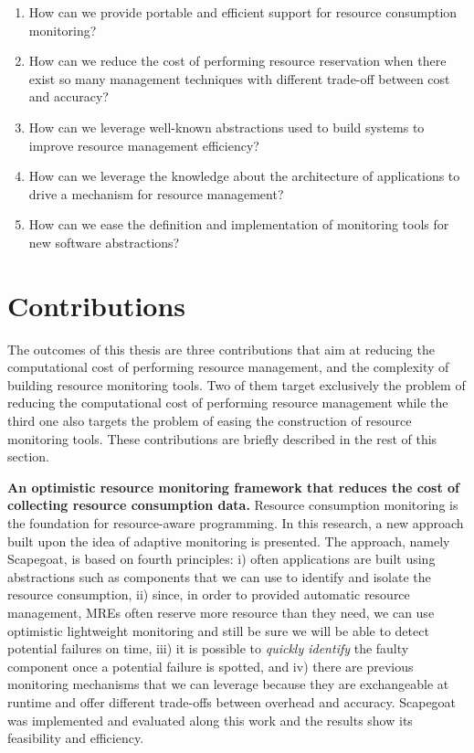 \begin{enumerate}
\item How can we provide portable and efficient support for resource consumption monitoring?
\item How can we reduce the cost of performing resource reservation when there exist so many management techniques with different trade-off between cost and accuracy?
\item How can we leverage well-known abstractions used to build systems to improve resource management efficiency?
\item How can we leverage the knowledge about the architecture of applications to drive a mechanism for resource management?
\item How can we ease the definition and implementation of monitoring tools for new software abstractions?
\end{enumerate}
 
\section{Contributions}

The outcomes of this thesis are three contributions that aim at reducing the computational cost of performing resource management, and the complexity of building resource monitoring tools.
Two of them target exclusively the problem of reducing the computational cost of performing resource management while the third one also targets the problem of easing the construction of resource monitoring tools. 
These contributions are briefly described in the rest of this section.

\textbf{An optimistic resource monitoring framework that reduces the cost of collecting resource consumption data.}
Resource consumption monitoring is the foundation for resource-aware programming.
In this research, a new approach built upon the idea of adaptive monitoring is presented.
The approach, namely Scapegoat, is based on fourth principles: i) often applications are built using abstractions such as components that we can use to identify and isolate the resource consumption, ii) since, in order to provided automatic resource management, MREs often reserve more resource than they need, we can use optimistic lightweight monitoring and still be sure we will be able to detect potential failures on time, iii) it is possible to \textit{quickly identify} the faulty component once a potential failure is spotted, and iv) there are previous monitoring mechanisms that we can leverage because they are exchangeable at runtime and offer different trade-offs between overhead and accuracy.
Scapegoat was implemented and evaluated along this work and the results show its feasibility and efficiency.

